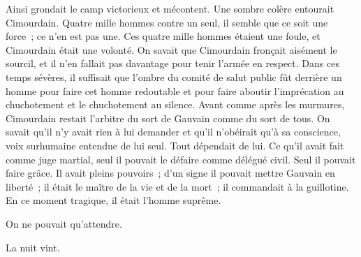 \documentclass[french,twoside]{book} %
\begin{document}
Ainsi grondait le camp victorieux et mécontent. Une sombre colère entourait Cimourdain. Quatre mille hommes contre un seul, il semble que ce soit une force ; ce n’en est pas une. Ces quatre mille hommes étaient une foule, et Cimourdain était une volonté. On savait que Cimourdain fronçait aisément le sourcil, et il n’en fallait pas davantage pour tenir l’armée en respect. Dans ces temps sévères, il suffisait que l’ombre du comité de salut public fût derrière un homme pour faire cet homme redoutable et pour faire aboutir l’imprécation au chuchotement et le chuchotement au silence. Avant comme après les murmures, Cimourdain restait l’arbitre du sort de Gauvain comme du sort de tous. On savait qu’il n’y avait rien à lui demander et qu’il n’obéirait qu’à sa conscience, voix surhumaine entendue de lui seul. Tout dépendait de lui. Ce qu’il avait fait comme juge martial, seul il pouvait le défaire comme délégué civil. Seul il pouvait faire grâce. Il avait pleins pouvoirs ;  d’un signe il pouvait mettre Gauvain en liberté ; il était le maître de la vie et de la mort ; il commandait à la guillotine. En ce moment tragique, il était l’homme suprême.\par
On ne pouvait qu’attendre.\par
La nuit vint.
\end{document}
